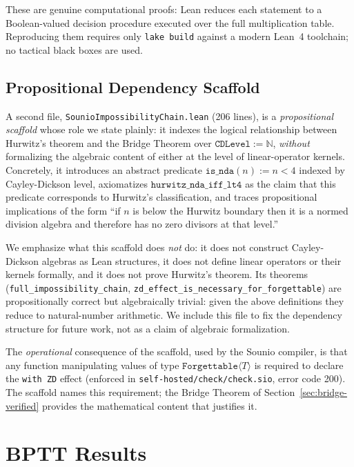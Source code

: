 \documentclass{article}
\newcommand{\Forgettable}[1]{\texttt{Forgettable}\langle #1 \rangle}
\begin{document}
These are genuine computational proofs: Lean reduces each statement to a
Boolean-valued decision procedure executed over the full multiplication
table. Reproducing them requires only \texttt{lake build} against a modern
Lean~4 toolchain; no tactical black boxes are used.

\subsection{Propositional Dependency Scaffold}
\label{sec:scaffold}

A second file, \texttt{SounioImpossibilityChain.lean} (206 lines), is a
\emph{propositional scaffold} whose role we state plainly: it indexes the
logical relationship between Hurwitz's theorem and the Bridge Theorem over
$\texttt{CDLevel} := \mathbb{N}$, \emph{without} formalizing the algebraic
content of either at the level of linear-operator kernels. Concretely, it
introduces an abstract predicate $\mathtt{is\_nda}(n) := n < 4$ indexed by
Cayley-Dickson level, axiomatizes
$\mathtt{hurwitz\_nda\_iff\_lt4}$ as the claim that this predicate corresponds
to Hurwitz's classification, and traces propositional implications
of the form ``if $n$ is below the Hurwitz boundary then it is a normed
division algebra and therefore has no zero divisors at that level.''

We emphasize what this scaffold does \emph{not} do: it does not construct
Cayley-Dickson algebras as Lean structures, it does not define linear
operators or their kernels formally, and it does not prove Hurwitz's theorem.
Its theorems (\texttt{full\_impossibility\_chain},
\texttt{zd\_effect\_is\_necessary\_for\_forgettable}) are propositionally
correct but algebraically trivial: given the above definitions they reduce
to natural-number arithmetic. We include this file to fix the dependency
structure for future work, not as a claim of algebraic formalization.

The \emph{operational} consequence of the scaffold, used by the Sounio
compiler, is that any function manipulating values of type $\Forgettable{T}$
is required to declare the \texttt{with ZD} effect (enforced in
\texttt{self-hosted/check/check.sio}, error code 200). The scaffold names
this requirement; the Bridge Theorem of Section~\ref{sec:bridge-verified}
provides the mathematical content that justifies it.

\section{BPTT Results}
\end{document}
